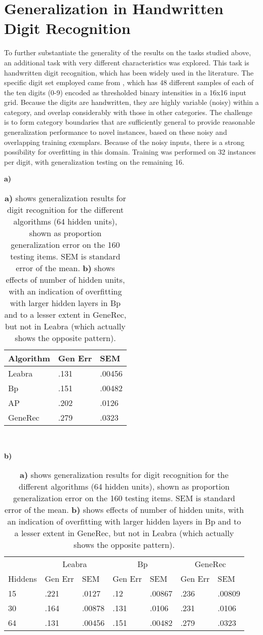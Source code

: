\documentclass[12pt,twoside]{article}
\begin{document}
\section{Generalization in Handwritten Digit Recognition}

To further substantiate the generality of the results on the tasks
studied above, an additional task with very different characteristics
was explored.  This task is handwritten digit recognition, which has
been widely used in the literature.  The specific digit set employed
came from , which has 48 different samples of each of
the ten digits (0-9) encoded as thresholded binary intensities in a
16x16 input grid.  Because the digits are handwritten, they are highly
variable (noisy) within a category, and overlap considerably with
those in other categories.  The challenge is to form category
boundaries that are sufficiently general to provide reasonable
generalization performance to novel instances, based on these noisy
and overlapping training exemplars.  Because of the noisy inputs,
there is a strong possibility for overfitting in this domain.
Training was performed on 32 instances per digit, with generalization
testing on the remaining 16.

\begin{table}
  \centering

{\bf a)}  \begin{tabular}{lll} \hline
Algorithm & Gen Err & SEM \\ \hline
Leabra  & .131 & .00456 \\
Bp      & .151 & .00482 \\
AP      & .202 & .0126 \\ 
GeneRec & .279 & .0323 \\ \hline
  \end{tabular} \\

\vspace*{.1in}

{\bf b)}  \begin{tabular}{lllllll} \hline
 & \multicolumn{2}{c}{Leabra} & \multicolumn{2}{c}{Bp} & \multicolumn{2}{c}{GeneRec} \\
Hiddens & Gen Err & SEM    & Gen Err & SEM    & Gen Err & SEM \\ \hline
15      & .221    & .0127  & .12     & .00867 & .236 & .00809 \\
30      & .164    & .00878 & .131    & .0106  & .231 & .0106  \\
64      & .131    & .00456 & .151    & .00482 & .279 & .0323  \\ \hline
  \end{tabular}
  \caption{\small {\bf a)} shows generalization results for digit
    recognition for the different algorithms (64 hidden units), shown
    as proportion generalization error on the 160 testing items.  SEM
    is standard error of the mean.  {\bf b)} shows effects of
    number of hidden units, with an indication of overfitting with
    larger hidden layers in Bp and to a lesser extent in GeneRec, but
    not in Leabra (which actually shows the opposite pattern).} 
  \label{tab.digs}
\end{table}
\end{document}
